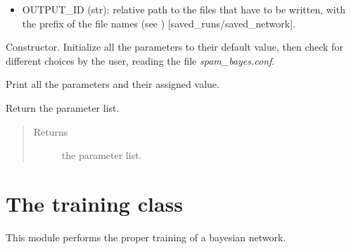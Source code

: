 \documentclass[letterpaper,10pt,english]{sphinxmanual}
\begin{document}
\begin{fulllineitems}
\begin{itemize}
\item {} 
OUTPUT\_ID (str): relative path to the files that have to be written, with the        prefix of the file names (see {\hyperref[index:naive_bayes.Bayes.write_bayes]{}})        {[}saved\_runs/saved\_network{]}.

\end{itemize}

\begin{fulllineitems}
\label{index:config.Config.__init__}
Constructor. Initialize all the parameters to their default value,
then check for different choices by the user, reading the file
\emph{spam\_bayes.conf}.

\end{fulllineitems}


\begin{fulllineitems}
\label{index:config.Config.cprint}
Print all the parameters and their assigned value.

\end{fulllineitems}


\begin{fulllineitems}
\label{index:config.Config.get_params}
Return the parameter list.
\begin{quote}\begin{description}
\item[{Returns}] \leavevmode
the parameter list.

\end{description}\end{quote}

\end{fulllineitems}


\end{fulllineitems}



\section{The training class}
\label{index:the-training-class}
This module performs the proper training of a bayesian network.
\label{index:module-trainer}
\end{document}
